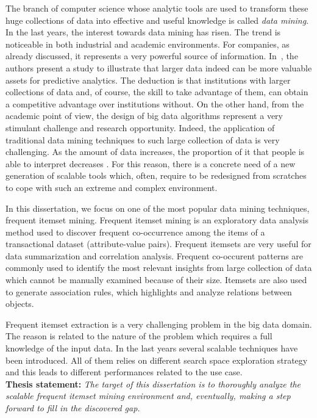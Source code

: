 The branch of computer science whose analytic tools are used to transform these huge collections of data into effective and useful knowledge is called \textit{data mining}.
In the last years, the interest towards data mining has risen. The trend is noticeable in both industrial and academic environments. For companies, as already discussed, it represents a very powerful source of information. In~\cite{junque2013predictive}, the authors present a study to illustrate that
larger data indeed can be more valuable assets for predictive analytics. The
deduction is that institutions with larger collections of data and, of course,
the skill to take advantage of them, can obtain a competitive advantage over
institutions without. 
On the other hand, from the academic point of view, the design of big data algorithms represent a very stimulant challenge and research opportunity. Indeed, the application of traditional data mining techniques to such large collection of data is very challenging. As the amount of data increases, the proportion of it that people is able to interpret decreases \cite{witten2005data}. For this reason, there is a concrete need of a new generation of scalable tools which, often, require to be redesigned from scratches to cope with such an extreme and complex environment.

In this dissertation, we focus on one of the most popular data mining techniques, frequent itemset mining. Frequent itemset mining is an exploratory data analysis method used to discover frequent co-occurrence among the items of a transactional dataset (attribute-value pairs). Frequent itemsets are very useful for data summarization and correlation analysis. 
Frequent co-occurent patterns are commonly used to identify the most relevant insights from large collection of data which cannot be manually examined because of their size. 
Itemsets are also used to generate association rules, which highlights and analyze relations between objects.

Frequent itemset extraction is a very challenging problem in the big data domain. The reason is related to the nature of the problem which requires a full knowledge of the input data. In the last years several scalable techniques have been introduced. All of them relies on different search space exploration strategy and this leads to different performances related to the use case. 
\\

\textbf{Thesis statement: }\textit{The target of this dissertation is to thoroughly analyze the scalable frequent itemset mining environment and, eventually, making a step forward to fill in the discovered gap.}

